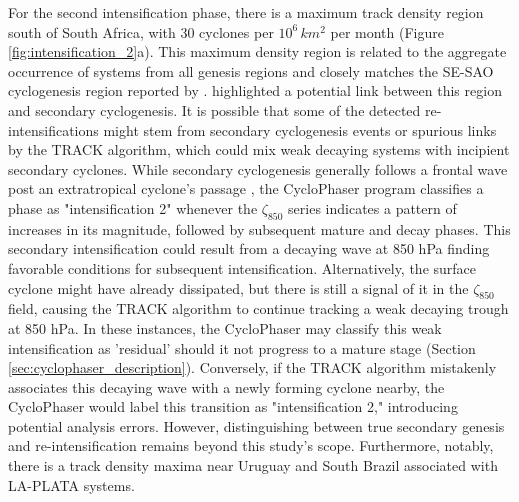 For the second intensification phase, there is a maximum track density region south of South Africa, with \(30\) cyclones per \(10^6 \, km^2\) per month (Figure \ref{fig:intensification_2}a). This maximum density region is related to the aggregate occurrence of systems from all genesis regions and closely matches the SE-SAO cyclogenesis region reported by \citet{gramcianinov2019properties}. \citet{gramcianinov2019properties} highlighted a potential link between this region and secondary cyclogenesis. It is possible that some of the detected re-intensifications might stem from secondary cyclogenesis events or spurious links by the TRACK algorithm, which could mix weak decaying systems with incipient secondary cyclones. While secondary cyclogenesis generally follows a frontal wave post an extratropical cyclone's passage \citep{Mailier_2006, Shapiro_1997, Ford_1990, Rivals_1998}, the CycloPhaser program classifies a phase as "intensification 2" whenever the \(\zeta_{850}\) series indicates a pattern of increases in its magnitude, followed by subsequent mature and decay phases. This secondary intensification could result from a decaying wave at 850 hPa finding favorable conditions for subsequent intensification. Alternatively, the surface cyclone might have already dissipated, but there is still a signal of it in the \(\zeta_{850}\) field, causing the TRACK algorithm to continue tracking a weak decaying trough at 850 hPa. In these instances, the CycloPhaser may classify this weak intensification as 'residual' should it not progress to a mature stage (Section \ref{sec:cyclophaser_description}). Conversely, if the TRACK algorithm mistakenly associates this decaying wave with a newly forming cyclone nearby, the CycloPhaser would label this transition as "intensification 2," introducing potential analysis errors. However, distinguishing between true secondary genesis and re-intensification remains beyond this study's scope. Furthermore, notably, there is a track density maxima near Uruguay and South Brazil associated with LA-PLATA systems.


